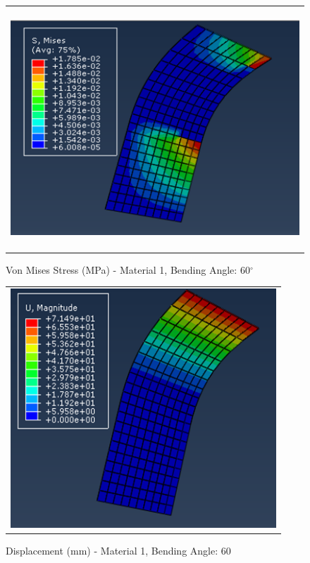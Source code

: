 \documentclass[a4paper,12pt]{article}
\numberwithin{equation}{section}
\numberwithin{figure}{section}
\begin{document}
\begin{figure}[H]
  \centering
  \begin{tabular}{@{}c@{}}
    \includegraphics[width=0.7\linewidth,height=255pt]{Results/Bending/M1_VMS_60.png} \\
  \end{tabular}
  \caption{Von Mises Stress (MPa) - Material 1,  Bending Angle: 60$^{\circ}$ }
\end{figure}

\begin{figure}[H]
  \centering
  \begin{tabular}{@{}c@{}}
    \includegraphics[width=0.7\linewidth,height=255pt]{Results/Bending/M1_DIS_60.png} \\
  \end{tabular}
  \caption{Displacement (mm) - Material 1, Bending Angle: 60}
\end{figure}
\end{document}
